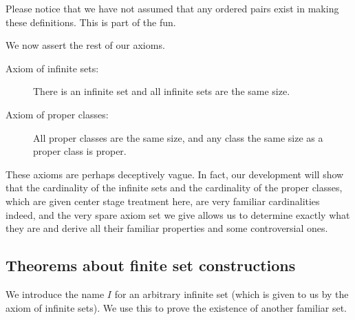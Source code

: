 \documentclass[12pt]{article}
\begin{document}
Please notice that we have not assumed that any ordered pairs exist in making these definitions.  This is part of the fun.

We now assert the rest of our axioms.

\begin{description}
 
\item[Axiom of infinite sets:]  There is an infinite set and all infinite sets are the same size.

\item[Axiom of proper classes:]  All proper classes are the same size, and any class the same size as a proper class is proper.

\end{description}

These axioms are perhaps deceptively vague.  In fact, our development will show that the cardinality of the infinite sets and the cardinality of the proper classes, which are given
center stage treatment here, are very familiar cardinalities indeed, and the very spare axiom set we give allows us to determine exactly what they are and derive all their familiar properties and some controversial ones.

\subsection{Theorems about finite set constructions}

We introduce the name $I$ for an arbitrary infinite set (which is given to us by the axiom of infinite sets).  We use this to prove the existence of another familiar set.
\end{document}

